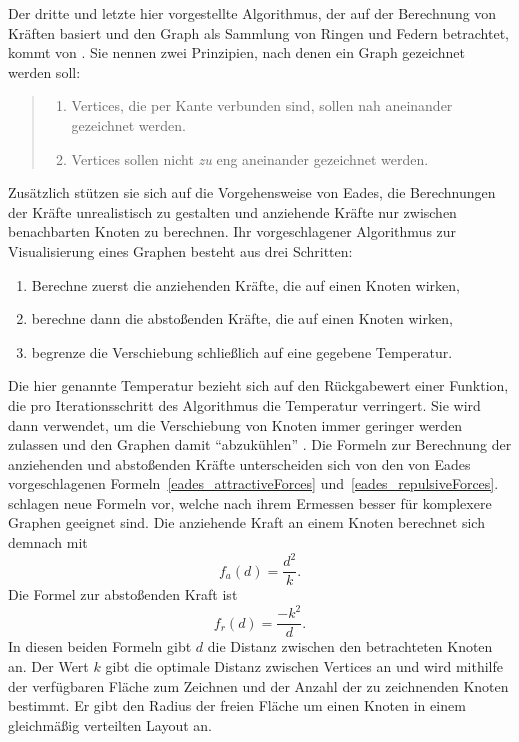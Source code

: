 \documentclass[12pt, a4paper]{article}
\begin{document}
Der dritte und letzte hier vorgestellte Algorithmus, der auf der Berechnung von Kräften basiert und den Graph als Sammlung von Ringen und Federn betrachtet, kommt von . Sie nennen zwei Prinzipien, nach denen ein Graph gezeichnet werden soll:
\begin{quote}
\begin{enumerate}
\item Vertices, die per Kante verbunden sind, sollen nah aneinander gezeichnet werden.
\item Vertices sollen nicht \textit{zu} eng aneinander gezeichnet werden.
\end{enumerate}
\end{quote}
Zusätzlich stützen sie sich auf die Vorgehensweise von Eades, die Berechnungen der Kräfte unrealistisch zu gestalten und anziehende Kräfte nur zwischen benachbarten Knoten zu berechnen.  Ihr vorgeschlagener Algorithmus zur Visualisierung eines Graphen besteht aus drei Schritten:
\begin{enumerate}
\item Berechne zuerst die anziehenden Kräfte, die auf einen Knoten wirken,
\item berechne dann die abstoßenden Kräfte, die auf einen Knoten wirken,
\item begrenze die Verschiebung schließlich auf eine gegebene Temperatur.
\end{enumerate}
Die hier genannte Temperatur bezieht sich auf den Rückgabewert einer Funktion, die pro Iterationsschritt des Algorithmus die Temperatur verringert. Sie wird dann verwendet, um die Verschiebung von Knoten immer geringer werden zulassen und den Graphen damit "`abzukühlen"' \cite[S.~1132f]{fruchterman1991graph}. Die Formeln zur Berechnung der anziehenden und abstoßenden Kräfte unterscheiden sich von den von Eades vorgeschlagenen Formeln~\ref{eades_attractiveForces} und~\ref{eades_repulsiveForces}. \citeauthor{fruchterman1991graph} schlagen neue Formeln vor, welche nach ihrem Ermessen besser für komplexere Graphen geeignet sind. Die anziehende Kraft an einem Knoten berechnet sich demnach mit
\begin{equation}
f_a(d) = \frac{d^2}{k}.
\end{equation}
Die Formel zur abstoßenden Kraft ist
\begin{equation}
f_r(d) = \frac{-k^2}{d}.
\end{equation}
In diesen beiden Formeln gibt $d$ die Distanz zwischen den betrachteten Knoten an. Der Wert $k$ gibt die optimale Distanz zwischen Vertices an und wird mithilfe der verfügbaren Fläche zum Zeichnen und der Anzahl der zu zeichnenden Knoten bestimmt. Er gibt den Radius der freien Fläche um einen Knoten in einem gleichmäßig verteilten Layout an.\\
\end{document}
